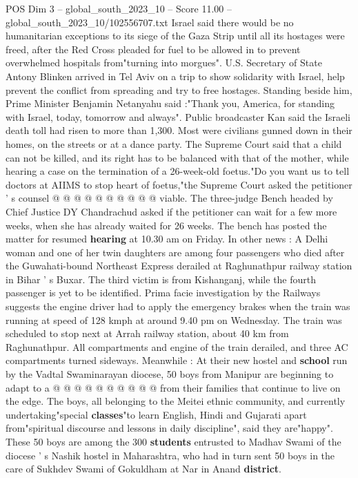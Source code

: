 \begin{textsample}{POS Dim 3 – global\_south\_2023\_10 – Score 11.00 – global\_south\_2023\_10/102556707.txt}  \label{ex:f3_pos_433}
Israel said there would be no humanitarian exceptions to its siege of the Gaza Strip until all its hostages were freed, after the Red Cross pleaded for fuel to be allowed in to prevent overwhelmed hospitals from"turning into morgues".
U.S.
Secretary of State Antony Blinken arrived in Tel Aviv on a trip to show solidarity with Israel, help prevent the conflict from spreading and try to free hostages.
Standing beside him, Prime Minister Benjamin Netanyahu said :"Thank you, America, for standing with Israel, today, tomorrow and always".
Public broadcaster Kan said the Israeli death toll had risen to more than 1,300.
Most were civilians gunned down in their homes, on the streets or at a dance party.
The Supreme Court said that a child can not be killed, and its right has to be balanced with that of the mother, while hearing a case on the termination of a 26-week-old foetus."Do you want us to tell doctors at AIIMS to stop heart of foetus,"the Supreme Court asked the petitioner ' s counsel @ @ @ @ @ @ @ @ @ @ viable.
The three-judge Bench headed by Chief Justice DY Chandrachud asked if the petitioner can wait for a few more weeks, when she has already waited for 26 weeks.
The bench has posted the matter for resumed \textbf{hearing} at 10.30 am on Friday.
In other news : A Delhi woman and one of her twin daughters are among four passengers who died after the Guwahati-bound Northeast Express derailed at Raghunathpur railway station in Bihar ' s Buxar.
The third victim is from Kishanganj, while the fourth passenger is yet to be identified.
Prima facie investigation by the Railways suggests the engine driver had to apply the emergency brakes when the train was running at speed of 128 kmph at around 9.40 pm on Wednesday.
The train was scheduled to stop next at Arrah railway station, about 40 km from Raghunathpur.
All compartments and engine of the train derailed, and three AC compartments turned sideways.
Meanwhile : At their new hostel and \textbf{school} run by the Vadtal Swaminarayan diocese, 50 boys from Manipur are beginning to adapt to a @ @ @ @ @ @ @ @ @ @ from their families that continue to live on the edge.
The boys, all belonging to the Meitei ethnic community, and currently undertaking"special \textbf{classes}"to learn English, Hindi and Gujarati apart from"spiritual discourse and lessons in daily discipline", said they are"happy".
These 50 boys are among the 300 \textbf{students} entrusted to Madhav Swami of the diocese ' s Nashik hostel in Maharashtra, who had in turn sent 50 boys in the care of Sukhdev Swami of Gokuldham at Nar in Anand \textbf{district}.

\end{textsample}
